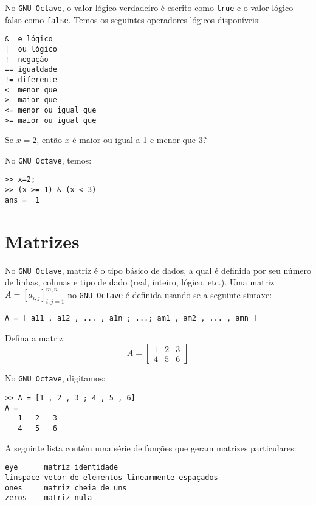 No \verb+GNU Octave+, o valor lógico verdadeiro é escrito como \verb+true+ e o valor lógico falso como \verb+false+. Temos os seguintes operadores lógicos disponíveis:
\begin{verbatim}
&  e lógico
|  ou lógico
!  negação
== igualdade
!= diferente
<  menor que
>  maior que
<= menor ou igual que
>= maior ou igual que
\end{verbatim}

\begin{ex}
  Se $x=2$, então $x$ é maior ou igual a 1 e menor que 3? 
\end{ex}
\begin{sol}
  No \verb+GNU Octave+, temos:
\begin{verbatim}
>> x=2;
>> (x >= 1) & (x < 3)
ans =  1
\end{verbatim}
\end{sol}

\section{Matrizes}

No \verb+GNU Octave+, matriz é o tipo básico de dados, a qual é definida por seu número de linhas, colunas e tipo de dado (real, inteiro, lógico, etc.). Uma matriz $A = [a_{i,j}]_{i,j=1}^{m,n}$ no \verb+GNU Octave+ é definida usando-se a seguinte sintaxe:
\begin{verbatim}
A = [ a11 , a12 , ... , a1n ; ...; am1 , am2 , ... , amn ]
\end{verbatim}

\begin{ex}
  Defina a matriz:
  \begin{equation}
    A = \left[
      \begin{array}{ccc}
        1 & 2 & 3\\
        4 & 5 & 6
      \end{array}
\right]
  \end{equation}
\end{ex}
\begin{sol}
  No \verb+GNU Octave+, digitamos:
\begin{verbatim}
>> A = [1 , 2 , 3 ; 4 , 5 , 6]
A =
   1   2   3
   4   5   6
\end{verbatim}
\end{sol}

A seguinte lista contém uma série de funções que geram matrizes particulares:
\begin{verbatim}
eye      matriz identidade
linspace vetor de elementos linearmente espaçados
ones     matriz cheia de uns
zeros    matriz nula
\end{verbatim}

